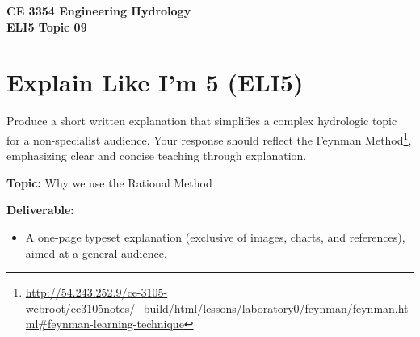\documentclass[12pt]{article}
\begin{document}
\begin{center}
    \textbf{CE 3354 Engineering Hydrology\\
    ELI5 Topic 09}
\end{center}

\section*{Explain Like I’m 5 (ELI5)}

Produce a short written explanation that simplifies a complex hydrologic topic for a non-specialist audience. Your response should reflect the Feynman Method\footnote{\url{http://54.243.252.9/ce-3105-webroot/ce3105notes/_build/html/lessons/laboratory0/feynman/feynman.html#feynman-learning-technique}}, emphasizing clear and concise teaching through explanation.

\textbf{Topic:} Why we use the Rational Method

\textbf{Deliverable:}
\begin{itemize}
    \item A one-page typeset explanation (exclusive of images, charts, and references), aimed at a general audience.
\end{itemize}
\end{document}
